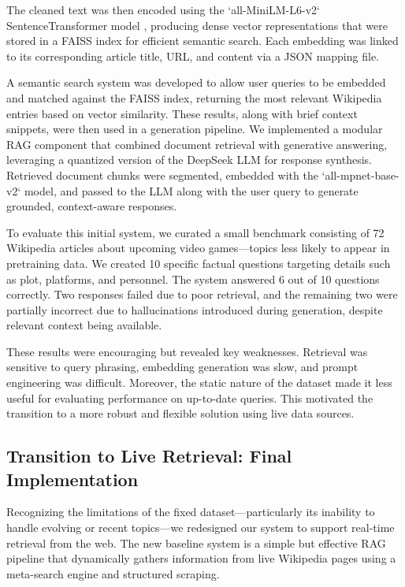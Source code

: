 \documentclass[fleqn,moreauthors,10pt]{ds_report}
\begin{document}
The cleaned text was then encoded using the `all-MiniLM-L6-v2` SentenceTransformer model \cite{sentence}, producing dense vector representations that were stored in a FAISS index \cite{faiss} for efficient semantic search. Each embedding was linked to its corresponding article title, URL, and content via a JSON mapping file.

A semantic search system was developed to allow user queries to be embedded and matched against the FAISS index, returning the most relevant Wikipedia entries based on vector similarity. These results, along with brief context snippets, were then used in a generation pipeline. We implemented a modular RAG component that combined document retrieval with generative answering, leveraging a quantized version of the DeepSeek LLM \cite{deepseek} for response synthesis. Retrieved document chunks were segmented, embedded with the `all-mpnet-base-v2` model, and passed to the LLM along with the user query to generate grounded, context-aware responses.

To evaluate this initial system, we curated a small benchmark consisting of 72 Wikipedia articles about upcoming video games—topics less likely to appear in pretraining data. We created 10 specific factual questions targeting details such as plot, platforms, and personnel. The system answered 6 out of 10 questions correctly. Two responses failed due to poor retrieval, and the remaining two were partially incorrect due to hallucinations introduced during generation, despite relevant context being available.

These results were encouraging but revealed key weaknesses. Retrieval was sensitive to query phrasing, embedding generation was slow, and prompt engineering was difficult. Moreover, the static nature of the dataset made it less useful for evaluating performance on up-to-date queries. This motivated the transition to a more robust and flexible solution using live data sources.

\subsection*{Transition to Live Retrieval: Final Implementation}

Recognizing the limitations of the fixed dataset—particularly its inability to handle evolving or recent topics—we redesigned our system to support real-time retrieval from the web. The new baseline system is a simple but effective RAG pipeline that dynamically gathers information from live Wikipedia pages using a meta-search engine and structured scraping.
\end{document}
